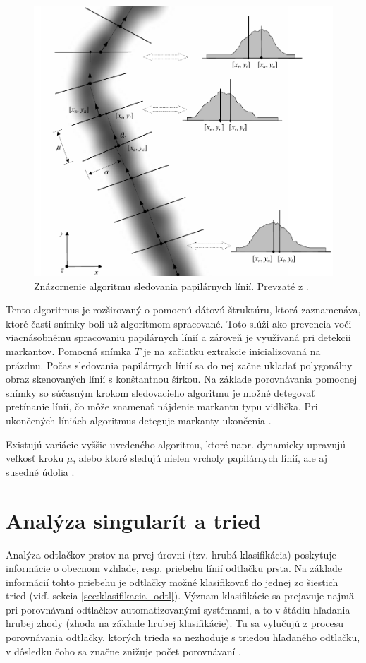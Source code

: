   \begin{figure}[h]
    \centering
    \includegraphics[width=0.65\linewidth]{obrazky-figures/ridge_following-maltoni.png}
    \caption{Znázornenie algoritmu sledovania papilárnych línií. Prevzaté z \cite{Handbook}.}
    \label{obr:sledovanie_linii}
  \end{figure}

  Tento algoritmus je rozširovaný o pomocnú dátovú štruktúru, ktorá zaznamenáva, ktoré časti snímky boli už algoritmom spracované. Toto slúži
  ako prevencia voči viacnásobnému spracovaniu papilárnych línií a zároveň je využívaná pri detekcii markantov. Pomocná snímka $T$ je na začiatku
  extrakcie inicializovaná na prázdnu. Počas sledovania papilárnych línií sa do nej začne ukladať polygonálny obraz skenovaných línií s konštantnou šírkou.
  Na základe porovnávania pomocnej snímky so súčasným krokom sledovacieho algoritmu je možné detegovať pretínanie línií, čo môže znamenať nájdenie markantu
  typu vidlička. Pri ukončených líniách algoritmus deteguje markanty ukončenia \cite{maio1997ridge_following}.

  Existujú variácie vyššie uvedeného algoritmu, ktoré napr. dynamicky upravujú veľkosť kroku $\mu$, alebo ktoré sledujú nielen vrcholy papilárnych línií,
  ale aj susedné údolia \cite{Handbook}.

  \section{Analýza singularít a tried}
  Analýza odtlačkov prstov na prvej úrovni (tzv. hrubá klasifikácia) poskytuje informácie o obecnom vzhľade, resp. priebehu línií odtlačku prsta.
  Na základe informácií tohto priebehu je odtlačky možné klasifikovať do jednej zo šiestich tried (viď. sekcia \ref{sec:klasifikacia_odtl}). Význam
  klasifikácie sa prejavuje najmä pri porovnávaní odtlačkov automatizovanými systémami, a to v štádiu hľadania hrubej zhody (zhoda na základe hrubej
  klasifikácie). Tu sa vylučujú z procesu porovnávania odtlačky, ktorých trieda sa nezhoduje s triedou hľadaného odtlačku, v dôsledku čoho sa značne znižuje
  počet porovnávaní \cite{karu1996classification, Handbook}.

